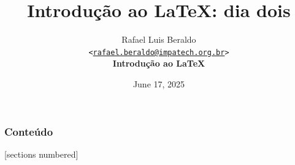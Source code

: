 \documentclass[numbering=fraction,aspectratio=169]{beamer}
\title{Introdução ao \LaTeX: dia dois}
\author[Rafael Beraldo]{Rafael Luis Beraldo\\
  \texttt{<\href{mailto:rafael.beraldo@impatech.org.br}{rafael.beraldo@impatech.org.br}>}\\
  \textbf{Introdução ao \LaTeX}}
\institute{\IMPATech}
\date{June 17, 2025}
\begin{document}
\frenchspacing

\begin{frame}[plain]{}
  \maketitle
\end{frame}

\begin{frame}
  \frametitle{Conteúdo}
  [sections numbered]
  \begin{multicols}{2}
    \tableofcontents
  \end{multicols}
\end{frame}












\end{document}
